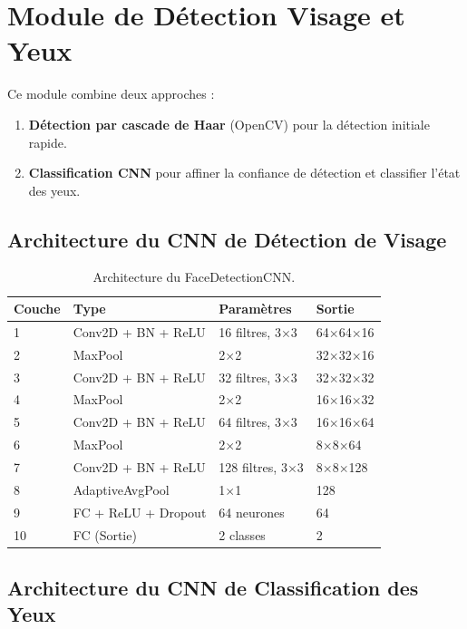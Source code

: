 \documentclass[12pt,a4paper]{report}
\begin{document}
\section{Module de Détection Visage et Yeux}

Ce module combine deux approches :
\begin{enumerate}
    \item \textbf{Détection par cascade de Haar} (OpenCV) pour la détection initiale rapide.
    \item \textbf{Classification CNN} pour affiner la confiance de détection et classifier l'état des yeux.
\end{enumerate}

\subsection{Architecture du CNN de Détection de Visage}

\begin{table}[H]
    \centering
    \caption{Architecture du FaceDetectionCNN.}
    \label{tab:face_cnn}
    \begin{tabular}{llll}
        \toprule
        \textbf{Couche} & \textbf{Type} & \textbf{Paramètres} & \textbf{Sortie} \\
        \midrule
        1 & Conv2D + BN + ReLU & 16 filtres, 3$\times$3 & 64$\times$64$\times$16 \\
        2 & MaxPool & 2$\times$2 & 32$\times$32$\times$16 \\
        3 & Conv2D + BN + ReLU & 32 filtres, 3$\times$3 & 32$\times$32$\times$32 \\
        4 & MaxPool & 2$\times$2 & 16$\times$16$\times$32 \\
        5 & Conv2D + BN + ReLU & 64 filtres, 3$\times$3 & 16$\times$16$\times$64 \\
        6 & MaxPool & 2$\times$2 & 8$\times$8$\times$64 \\
        7 & Conv2D + BN + ReLU & 128 filtres, 3$\times$3 & 8$\times$8$\times$128 \\
        8 & AdaptiveAvgPool & 1$\times$1 & 128 \\
        9 & FC + ReLU + Dropout & 64 neurones & 64 \\
        10 & FC (Sortie) & 2 classes & 2 \\
        \bottomrule
    \end{tabular}
\end{table}

\subsection{Architecture du CNN de Classification des Yeux}
\end{document}
